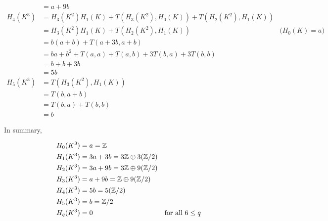 \documentclass{article}
\begin{document}
\begin{align*}
    &= a + 9b \\
    H_4(K^3)
    &= H_3(K^2) H_1(K) + T(H_3(K^2), H_0(K)) + T(H_2(K^2), H_1(K)) \\
    &= H_3(K^2) H_1(K) + T(H_2(K^2), H_1(K)) &\text{($H_0(K) = a$)} \\
    &= b (a + b) + T(a + 3b, a + b) \\
    &= ba + b^2 + T(a, a) + T(a, b) + 3T(b, a) + 3T(b, b) \\
    &= b + b + 3b \\
    &= 5b \\
    H_5(K^3)
    &= T(H_3(K^2), H_1(K)) \\
    &= T(b, a + b) \\
    &= T(b, a) + T(b, b) \\
    &= b
\end{align*}

In summary,

\begin{align*}
    H_0(K^3) &= a = \mathbb{Z} \\
    H_1(K^3) &= 3a + 3b = 3 \mathbb{Z} \oplus 3 (\mathbb{Z}/2) \\
    H_2(K^3) &= 3a + 9b = 3 \mathbb{Z} \oplus 9 (\mathbb{Z}/2) \\
    H_3(K^3) &= a + 9b = \mathbb{Z} \oplus 9 (\mathbb{Z}/2) \\
    H_4(K^3) &= 5b = 5 (\mathbb{Z} / 2) \\
    H_5(K^3) &= b = \mathbb{Z} / 2 \\
    H_q(K^3) &= 0 &\text{for all $6 \leq q$} \\
\end{align*}
\end{document}
